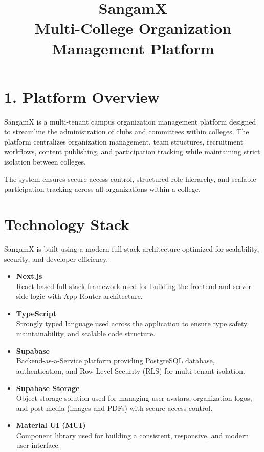 \documentclass[12pt]{article}
\title{\textbf{SangamX}\\
\large Multi-College Organization Management Platform}
\author{}
\date{}
\begin{document}
\maketitle
\onehalfspacing

\section*{1. Platform Overview}

SangamX is a multi-tenant campus organization management platform designed to streamline the administration of clubs and committees within colleges. The platform centralizes organization management, team structures, recruitment workflows, content publishing, and participation tracking while maintaining strict isolation between colleges.

The system ensures secure access control, structured role hierarchy, and scalable participation tracking across all organizations within a college.

\section*{Technology Stack}

SangamX is built using a modern full-stack architecture optimized for scalability, security, and developer efficiency.

\begin{itemize}
    \item \textbf{Next.js} \\
    React-based full-stack framework used for building the frontend and server-side logic with App Router architecture.

    \item \textbf{TypeScript} \\
    Strongly typed language used across the application to ensure type safety, maintainability, and scalable code structure.

    \item \textbf{Supabase} \\
    Backend-as-a-Service platform providing PostgreSQL database, authentication, and Row Level Security (RLS) for multi-tenant isolation.

    \item \textbf{Supabase Storage} \\
    Object storage solution used for managing user avatars, organization logos, and post media (images and PDFs) with secure access control.

    \item \textbf{Material UI (MUI)} \\
    Component library used for building a consistent, responsive, and modern user interface.
\end{itemize}
\end{document}

